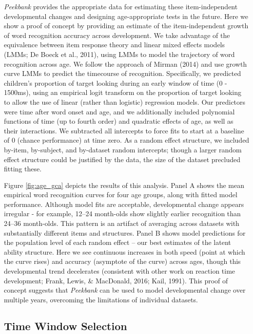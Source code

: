 \documentclass[10pt, letterpaper]{article}
\begin{document}
\emph{Peekbank} provides the appropriate data for estimating these
item-independent developmental changes and designing age-appropriate
tests in the future. Here we show a proof of concept by providing an
estimate of the item-independent growth of word recognition accuracy
across development. We take advantage of the equivalence between item
response theory and linear mixed effects models (LMMs; De Boeck et al.,
2011), using LMMs to model the trajectory of word recognition across
age. We follow the approach of Mirman (2014) and use growth curve LMMs
to predict the timecourse of recognition. Specifically, we predicted
children's proportion of target looking during an early window of time
(0 - 1500ms), using an empirical logit transform on the proportion of
target looking to allow the use of linear (rather than logistic)
regression models. Our predictors were time after word onset and age,
and we additionally included polynomial functions of time (up to fourth
order) and quadratic effects of age, as well as their interactions. We
subtracted all intercepts to force fits to start at a baseline of 0
(chance performance) at time zero. As a random effect structure, we
included by-item, by-subject, and by-dataset random intercepts; though a
larger random effect structure could be justified by the data, the size
of the dataset precluded fitting these.

Figure \ref{fig:age_gca} depicts the results of this analysis. Panel A
shows the mean empirical word recognition curves for four age groups,
along with fitted model performance. Although model fits are acceptable,
developmental change appears irregular - for example, 12--24 month-olds
show slightly earlier recognition than 24--36 month-olds. This pattern
is an artifact of averaging across datasets with substantially different
items and structures. Panel B shows model predictions for the population
level of each random effect -- our best estimates of the latent ability
structure. Here we see continuous increases in both speed (point at
which the curve rises) and accuracy (asymptote of the curve) across
ages, though this developmental trend decelerates (consistent with other
work on reaction time development; Frank, Lewis, \& MacDonald, 2016;
Kail, 1991). This proof of concept suggests that \emph{Peekbank} can be
used to model developmental change over multiple years, overcoming the
limitations of individual datasets.

\hypertarget{time-window-selection}{%
\subsection{Time Window Selection}\label{time-window-selection}}
\end{document}
